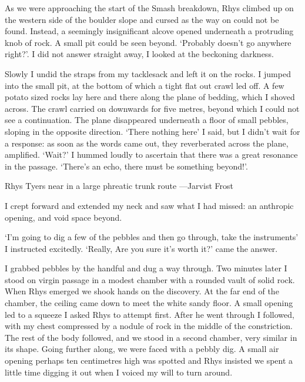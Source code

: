 As we were approaching the start of the Smash breakdown, Rhys climbed up on the western side of the boulder slope and cursed as the way on could not be found. Instead, a seemingly insignificant alcove opened underneath a protruding knob of rock. A small pit could be seen beyond. `Probably doesn't go anywhere right?'. I did not answer straight away, I looked at the beckoning darkness.

Slowly I undid the straps from my tacklesack and left it on the rocks. I jumped into the small  pit, at the bottom of which a tight flat out crawl led off. A few potato sized rocks lay here and there along the plane of bedding, which I shoved across. The crawl carried on downwards for five metres, beyond which I could not see a continuation. The plane disappeared underneath a floor of small pebbles, sloping in the opposite direction. `There nothing here' I said, but I didn't wait for a response: as soon as the words came out, they reverberated across the plane, amplified. `Wait?' I hummed loudly to ascertain that there was a great resonance in the passage. `There's an echo, there must be something beyond!'.
\begin{marginfigure}
	\checkoddpage \ifoddpage \forcerectofloat \else \forceversofloat \fi
	\centering
	\caption{Rhys Tyers near  in a large phreatic trunk route ---Jarvist Frost}
	\label{near duck}
\end{marginfigure}


I crept forward and extended my neck and saw what I had missed: an anthropic opening, and void space beyond. 

`I'm going to dig a few of the pebbles and then go through, take the instruments' I instructed excitedly. `Really, Are you sure it's worth it?' came the answer. 

I grabbed pebbles by the handful and dug a way through. Two minutes later I stood on virgin passage in a modest chamber with a rounded vault of solid rock. When Rhys emerged we shook hands on the discovery. At the far end of the chamber, the ceiling came down to meet the white sandy floor. A small opening led to a squeeze I asked Rhys to attempt first. After he went through I followed, with my chest compressed by a nodule of rock in the middle of the constriction. The rest of the body followed, and we stood in a second chamber, very similar in its shape. Going further along, we were faced with a pebbly dig. A small air opening perhaps ten centimetres high was spotted and Rhys insisted we spent a little time digging it out when I voiced my will to turn around. 

